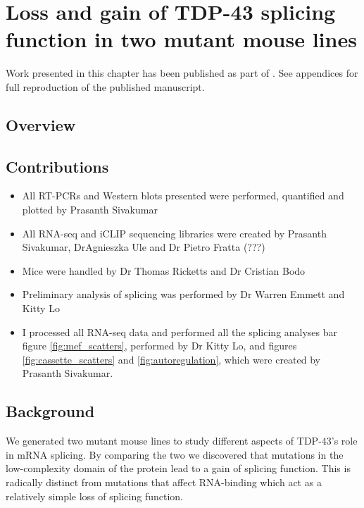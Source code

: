 \chapter{Loss and gain of TDP-43 splicing function in two mutant mouse lines}
\label{chapter:tdp_mice}

Work presented in this chapter has been published as part of \citep{Fratta2018}. See appendices for full reproduction of the published manuscript.

\section{Overview}


\section{Contributions}
\begin{itemize}
	\item All RT-PCRs and Western blots presented were performed, quantified and plotted by Prasanth Sivakumar
	\item All RNA-seq and iCLIP sequencing libraries were created by Prasanth Sivakumar, DrAgnieszka Ule and Dr Pietro Fratta (???)
	\item Mice were handled by Dr Thomas Ricketts and Dr Cristian Bodo
	\item Preliminary analysis of splicing was performed by Dr Warren Emmett and Kitty Lo
	\item I processed all RNA-seq data and performed all the splicing analyses bar figure \ref{fig:mef_scatters}, performed by Dr Kitty Lo, and figures \ref{fig:cassette_scatters} and \ref{fig:autoregulation}, which were created by Prasanth Sivakumar.
\end{itemize}





\section{Background}

We generated two mutant mouse lines to study different aspects of TDP-43's role in mRNA splicing.
By comparing the two we discovered that mutations in the low-complexity domain of the protein lead to a gain of splicing function. This is radically distinct from mutations that affect RNA-binding which act as a relatively simple loss of splicing function.


